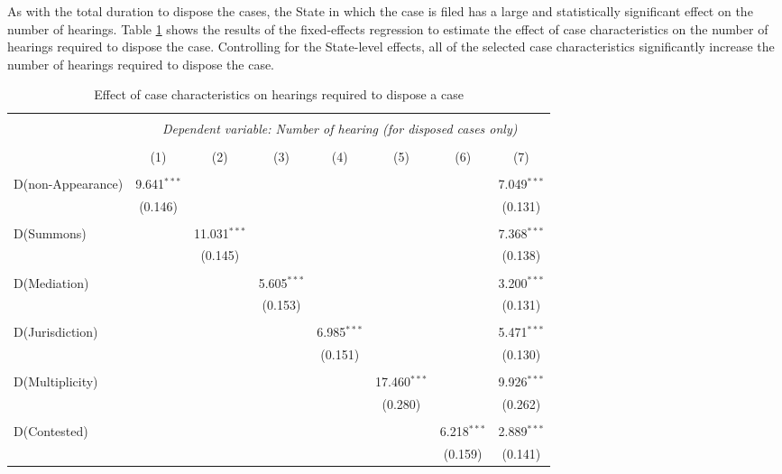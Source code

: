 As with the total duration to dispose the cases, the State in which the case is filed has a large and statistically significant effect on the number of hearings. Table \ref{tab:hearings_regression} shows the results of the fixed-effects regression to estimate the effect of case characteristics on the number of hearings required to dispose the case. Controlling for the State-level effects, all of the selected case characteristics significantly increase the number of hearings required to dispose the case.

{\footnotesize
 \begin{longtable}{lccccccc}
 \caption{Effect of case characteristics on hearings required to dispose a case}\label{tab:hearings_regression}\\
 \\[-1.8ex]
 \hline \\[-1.8ex] 
 & \multicolumn{7}{c}{\textit{Dependent variable: Number of hearing (for disposed cases only)}} \\ 
 \cline{2-8} 
 \\[-1.8ex] & (1) & (2) & (3) & (4) & (5) & (6) & (7)\\ 
 \hline \\[-1.8ex]
 D(non-Appearance) & 9.641$^{***}$ & & & & & & 7.049$^{***}$ \\ 
 & (0.146) & & & & & & (0.131) \\ 
 & & & & & & & \\ 
 D(Summons) & & 11.031$^{***}$ & & & & & 7.368$^{***}$ \\ 
 & & (0.145) & & & & & (0.138) \\ 
 & & & & & & & \\ 
 D(Mediation) & & & 5.605$^{***}$ & & & & 3.200$^{***}$ \\ 
 & & & (0.153) & & & & (0.131) \\ 
 & & & & & & & \\ 
 D(Jurisdiction) & & & & 6.985$^{***}$ & & & 5.471$^{***}$ \\ 
 & & & & (0.151) & & & (0.130) \\ 
 & & & & & & & \\ 
 D(Multiplicity) & & & & & 17.460$^{***}$ & & 9.926$^{***}$ \\ 
 & & & & & (0.280) & & (0.262) \\ 
 & & & & & & & \\ 
 D(Contested) & & & & & & 6.218$^{***}$ & 2.889$^{***}$ \\ 
 & & & & & & (0.159) & (0.141) \\ 

\end{longtable}}

